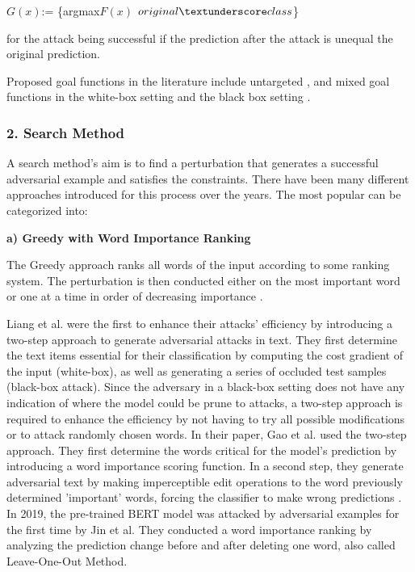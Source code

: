 $G(x)$:= \{argmax$F(x)$ \neq $original\textunderscore class$\}

for the attack being successful if the prediction after the attack is unequal the original prediction. 

Proposed goal functions in the literature include untargeted \cite{ebrahimi2017hotflip, alzantot2018generating, li2018textbugger, jin2019bert, garg2020bae}, and mixed goal functions \cite{gao2018black} in the white-box setting \cite{papernot2016crafting, liang2017deep, ebrahimi2017hotflip, jin2019bert} and the black box setting \cite{gao2018black, goodman2020fastwordbug}.

\subsubsection{2. Search Method}

A search method's aim is to find a perturbation that generates a successful adversarial example and satisfies the constraints. There have been many different approaches introduced for this process over the years. The most popular can be categorized into:

    \textbf{a) Greedy with Word Importance Ranking}
    
        The Greedy approach ranks all words of the input according to some ranking system. The perturbation is then conducted either on the most important word or one at a time in order of decreasing importance \cite{li2018textbugger, jin2019bert, garg2020bae}.
    
        Liang et al. were the first to enhance their attacks' efficiency by introducing a two-step approach to generate adversarial attacks in text. They first determine the text items essential for their classification by computing the cost gradient of the input (white-box), as well as generating a series of occluded test samples (black-box attack)\cite{liang2017deep}. 
        Since the adversary in a black-box setting does not have any indication of where the model could be prune to attacks, a two-step approach is required to enhance the efficiency by not having to try all possible modifications or to attack randomly chosen words. 
        In their paper, Gao et al. used the two-step approach. They first determine the words critical for the model's prediction by introducing a word importance scoring function. In a second step, they generate adversarial text by making imperceptible edit operations to the word previously determined 'important' words, forcing the classifier to make wrong predictions \cite{gao2018black}.
        In 2019, the pre-trained BERT model was attacked by adversarial examples for the first time by Jin et al. They conducted a word importance ranking by analyzing the prediction change before and after deleting one word, also called Leave-One-Out Method.  
        
